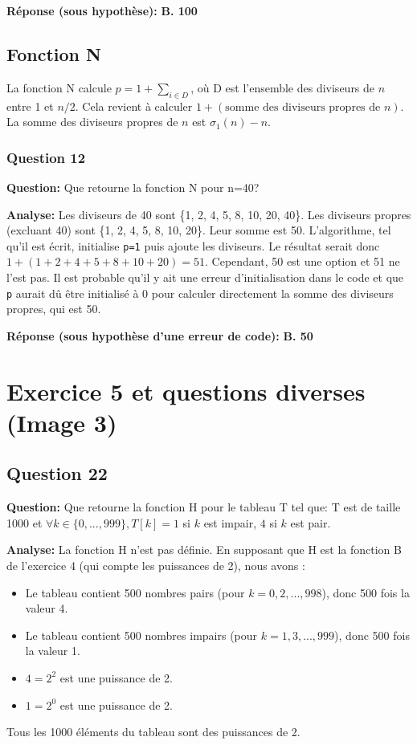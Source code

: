 \documentclass[12pt,a4paper]{article}
\begin{document}
\textbf{Réponse (sous hypothèse):} \textbf{B. 100}

\subsection{Fonction N}
La fonction N calcule $p = 1 + \sum_{i \in D}$, où D est l'ensemble des diviseurs de $n$ entre 1 et $n/2$. Cela revient à calculer $1 + (\text{somme des diviseurs propres de } n)$. La somme des diviseurs propres de $n$ est $\sigma_1(n) - n$.

\subsubsection{Question 12}
\textbf{Question:} Que retourne la fonction N pour n=40?

\textbf{Analyse:} Les diviseurs de 40 sont \{1, 2, 4, 5, 8, 10, 20, 40\}. Les diviseurs propres (excluant 40) sont \{1, 2, 4, 5, 8, 10, 20\}. Leur somme est 50.
L'algorithme, tel qu'il est écrit, initialise \texttt{p=1} puis ajoute les diviseurs. Le résultat serait donc $1 + (1+2+4+5+8+10+20) = 51$.
Cependant, 50 est une option et 51 ne l'est pas. Il est probable qu'il y ait une erreur d'initialisation dans le code et que \texttt{p} aurait dû être initialisé à 0 pour calculer directement la somme des diviseurs propres, qui est 50.

\textbf{Réponse (sous hypothèse d'une erreur de code):} \textbf{B. 50}

\section{Exercice 5 et questions diverses (Image 3)}

\subsection{Question 22}
\textbf{Question:} Que retourne la fonction H pour le tableau T tel que: T est de taille 1000 et $\forall k \in \{0, ..., 999\}, T[k] = 1$ si $k$ est impair, $4$ si $k$ est pair.

\textbf{Analyse:} La fonction H n'est pas définie. En supposant que H est la fonction B de l'exercice 4 (qui compte les puissances de 2), nous avons :
\begin{itemize}
    \item Le tableau contient 500 nombres pairs (pour $k=0, 2, ..., 998$), donc 500 fois la valeur 4.
    \item Le tableau contient 500 nombres impairs (pour $k=1, 3, ..., 999$), donc 500 fois la valeur 1.
    \item $4 = 2^2$ est une puissance de 2.
    \item $1 = 2^0$ est une puissance de 2.
\end{itemize}
Tous les 1000 éléments du tableau sont des puissances de 2.
\end{document}
